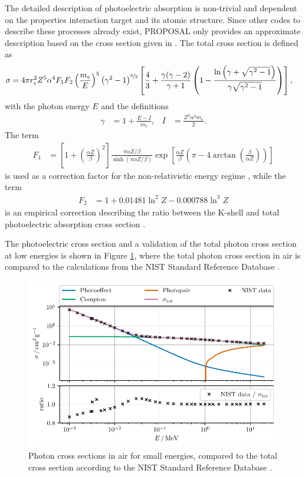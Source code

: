 The detailed description of photoelectric absorption is non-trivial and dependent on the properties interaction target and its atomic structure.
Since other codes to describe these processes already exist, PROPOSAL only provides an approximate description based on the cross section given in \cite{heitler, sauter}.
The total cross section is defined as
%
\begin{align}
	\label{eqn:sauter}
	\sigma &= 4 \pi r_e^2 Z^5 \alpha^4 F_1 F_2 \left( \frac{m_e}{E} \right)^5 \left( \gamma^2 -1 \right)^{\sfrac{3}{2}} \left[ \frac{4}{3} + \frac{\gamma (\gamma - 2)}{\gamma + 1} \left( 1 - \frac{\ln{\left( \gamma + \sqrt{\gamma^2 - 1} \right)}}{\gamma \sqrt{\gamma^2 - 1}}  \right) \right],
\end{align}
%
with the photon energy $E$ and the definitions
\begin{align}
	\gamma &= 1 + \frac{E - I}{m_e}, & I &= \frac{Z^2 \alpha^2 m_e}{2}.
\end{align}
%
The term
\begin{align}
	F_1 &= \left[ 1 + \left( \frac{\alpha Z}{\beta} \right)^2 \right] \frac{\pi \alpha Z / \beta }{\sinh(\pi \alpha Z / \beta )} \exp\left[ \frac{\alpha Z}{\beta} \left( \pi - 4 \arctan\left( \frac{\beta}{\alpha Z} \right) \right) \right]
\end{align}
%
is used as a correction factor for the non-relativistic energy regime \cite{sauter}, while the term
%
\begin{align}
	F_2 &= 1 + 0.01481 \ln^2{Z} - 0.000788 \ln^3{Z}
\end{align}
%
is an empirical correction describing the ratio between the K-shell and total photoelectric absorption cross section \cite{hubbell1969}.

The photoelectric cross section and a validation of the total photon cross section at low energies is shown in Figure \ref{fig:photoeffect_nist}, where the total photon cross section in air is compared to the calculations from the NIST Standard Reference Database \cite{nist}.

\begin{figure}
	\centering
    \includegraphics{plots/photoeffect_nist.pdf}
    \caption{Photon cross sections in air for small energies, compared to the total cross section according to the NIST Standard Reference Database \cite{nist}.}
    \label{fig:photoeffect_nist}
\end{figure}

